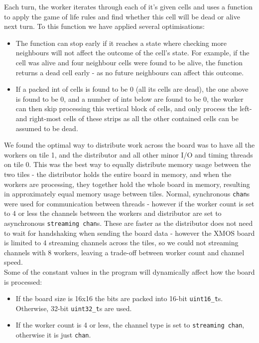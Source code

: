 \documentclass[]{article}
\begin{document}
Each turn, the worker iterates through each of it's given cells and uses a function to apply the game of life rules and find whether this cell will be dead or alive next turn. To this function we have applied several optimisations:
\begin{itemize}
	\item The function can stop early if it reaches a state where checking more neighbours will not affect the outcome of the cell's state. For example, if the cell was alive and four neighbour cells were found to be alive, the function returns a dead cell early - as no future neighbours can affect this outcome.
	\item If a packed int of cells is found to be 0 (all its cells are dead), the one above is found to be 0, and a number of ints below are found to be 0, the worker can then skip processing this vertical block of cells, and only process the left- and right-most cells of these strips as all the other contained cells can be assumed to be dead.
\end{itemize}

We found the optimal way to distribute work across the board was to have all the workers on tile 1, and the distributor and all other minor I/O and timing threads on tile 0. This was the best way to equally distribute memory usage between the two tiles - the distributor holds the entire board in memory, and when the workers are processing, they together hold the whole board in memory, resulting in approximately equal memory usage between tiles. Normal, synchronous \lstinline{chan}s were used for communication between threads - however if the worker count is set to 4 or less the channels between the workers and distributor are set to asynchronous \lstinline|streaming chan|s. These are faster as the distributor does not need to wait for handshaking when sending the board data - however the XMOS board is limited to 4 streaming channels across the tiles, so we could not streaming channels with 8 workers, leaving a trade-off between worker count and channel speed.\\

Some of the constant values in the program will dynamically affect how the board is processed:
\begin{itemize}
	\item If the board size is 16x16 the bits are packed into 16-bit \lstinline|uint16_t|s. Otherwise, 32-bit \lstinline|uint32_t|s are used.
	\item If the worker count is 4 or less, the channel type is set to \lstinline|streaming chan|, otherwise it is just \lstinline|chan|.
\end{itemize}
\end{document}

